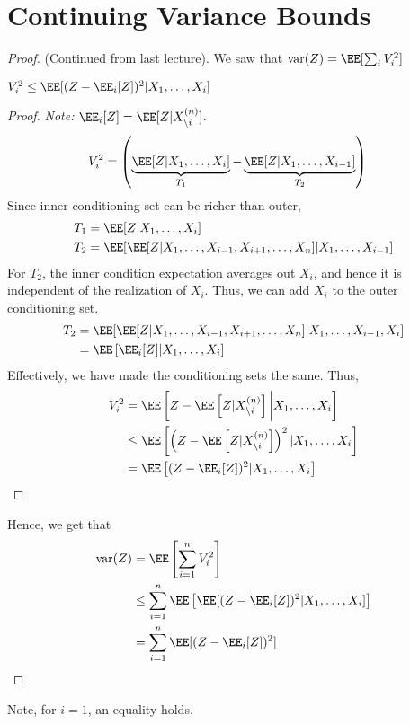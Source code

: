 \chapter{Continuing Variance Bounds}
\begin{proof} (Continued from last lecture). We saw that $\text{var}(Z) = \EE[\sum_i V_i^2]$
    
\begin{prop}
$V_i^2 \leq \EE[(Z-\EE_i[Z])^2 | X_1, \dots, X_i]$
\end{prop}
\begin{proof}
\textit{Note:} $\EE_i[Z] = \EE[Z | X_{\setminus i}^{(n)}]$.
\begin{align*}
    V_i^2 &= \left(\underbrace{\EE[Z | X_1, \dots, X_i]}_{T_1} - \underbrace{\EE[Z | X_1, \dots, X_{i-1}]}_{T_2} \right)
\end{align*}
Since inner conditioning set can be richer than outer,
\begin{align*}
    T_1 &= \EE[Z | X_1, \dots, X_i] \\
    T_2 &= \EE[\EE[Z | X_1, \dots, X_{i-1}, X_{i+1}, \dots, X_n] | X_1, \dots, X_{i-1}]
\end{align*}
For $T_2$, the inner condition expectation averages out $X_i$, and hence it is independent of the realization of $X_i$. Thus, we can add $X_i$ to the outer conditioning set.
\begin{align*}
    T_2 &= \EE[\EE[Z | X_1, \dots, X_{i-1}, X_{i+1}, \dots, X_n] | X_1, \dots, X_{i-1}, X_i] \\
    &= \EE\left[\EE_i[Z] | X_1, \dots, X_i\right]
\end{align*}
Effectively, we have made the conditioning sets the same.
Thus,
\begin{align*}
    V_i^2 &= \EE\left[Z - \EE\left[Z  | X_{\setminus i}^{(n)}\right] \bigg| X_1,\dots,X_i\right] \\
    &\leq \EE\left[\left(Z - \EE\left[Z  | X_{\setminus i}^{(n)}\right]\right)^2 | X_1, \dots, X_i\right] \\
    &= \EE\left[(Z - \EE_i[Z])^2 | X_1, \dots, X_i\right]
\end{align*}
\end{proof}
Hence, we get that
\begin{align*}
    \text{var}(Z) &= \EE\left[\sum_{i=1}^n V_i^2\right] \\
    &\leq \sum_{i=1}^n \EE\left[\EE[(Z - \EE_i[Z])^2 | X_1, \dots, X_i]\right] \\
    &= \sum_{i=1}^n \EE[(Z - \EE_i[Z])^2]
\end{align*}
\end{proof}
Note, for $i = 1$, an equality holds.

